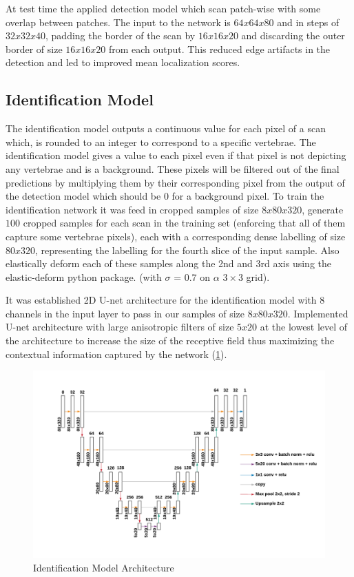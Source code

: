 At test time the applied detection model which scan patch-wise with some overlap between patches. The input to the network is $64 x 64 x 80$ and in steps of $32 x 32 x 40$, padding the border of the scan by $16 x 16 x 20$ and discarding the outer border of size $16 x 16 x 20$ from each output. This reduced edge artifacts in the detection and led to improved mean localization scores.

\subsection{Identification Model}
The identification model outputs a continuous value for each pixel of a scan which, is rounded to an integer to correspond to a specific vertebrae. The identification model gives a value to each pixel even if that pixel is not depicting any vertebrae and is a background. These pixels will be filtered out of the final predictions by multiplying them by their corresponding pixel from the output of the detection model which should be $0$ for a background pixel. To train the identification network it was feed in cropped samples of size $8 x 80 x 320$, generate $100$ cropped samples for each scan in the training set (enforcing that all of them capture some vertebrae pixels), each with a corresponding dense labelling of size $80 x 320$, representing the labelling for the fourth slice of the input sample. Also elastically deform each of these samples along the 2nd and 3rd axis using the elastic-deform python package. (with $\sigma$ = 0.7 on $\alpha$ $3 × 3$ grid).

It was established 2D U-net architecture for the identification model with $8$ channels in the input layer to pass in our samples of size $8 x 80 x 320$. Implemented U-net architecture with large anisotropic filters of size $5 x 20$ at the lowest level of the architecture to increase the size of the receptive field thus maximizing the contextual information captured by the network (\ref{fig:identification_model_architecture}). 

\begin{figure}[!h]
\begin{center}
\includegraphics[width=.5\linewidth]{images/identification_model_architecture.png}
\caption {Identification Model Architecture} 
\label{fig:identification_model_architecture}
\end{center}
\end{figure}

